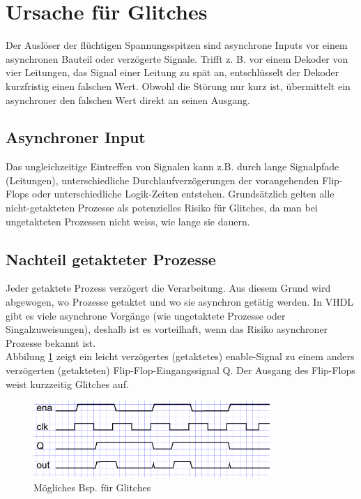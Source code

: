 \section{Ursache für Glitches}\label{sect.glitch_ursache}
Der Auslöser der flüchtigen Spannungsspitzen sind asynchrone Inputs vor einem asynchronen Bauteil oder verzögerte Signale. Trifft z. B. vor einem Dekoder von vier Leitungen, das Signal einer Leitung zu spät an, entschlüsselt der Dekoder kurzfristig einen falschen Wert. Obwohl die Störung nur kurz ist, übermittelt ein asynchroner den falschen Wert direkt an seinen Ausgang. \\

\subsection{Asynchroner Input}
Das ungleichzeitige Eintreffen von Signalen kann z.B. durch lange Signalpfade (Leitungen), unterschiedliche Durchlaufverzögerungen der vorangehenden Flip-Flops oder unterschiedliche Logik-Zeiten entstehen. Grundsätzlich gelten alle nicht-getakteten Prozesse als potenzielles Risiko für Glitches, da man bei ungetakteten Prozessen nicht weiss, wie lange sie dauern.\\

\subsection{Nachteil getakteter Prozesse}
Jeder getaktete Prozess verzögert die Verarbeitung. Aus diesem Grund wird abgewogen, wo Prozesse getaktet und wo sie asynchron getätig werden. In VHDL gibt es viele asynchrone Vorgänge (wie ungetaktete Prozesse oder Singalzuweisungen), deshalb ist es vorteilhaft, wenn das Risiko asynchroner Prozesse bekannt ist.\\


Abbilung \ref{fig.glitch.bild1} zeigt ein leicht verzögertes (getaktetes) enable-Signal zu einem anders verzögerten (getakteten) Flip-Flop-Eingangssignal Q. Der Ausgang des Flip-Flops weist kurzzeitig Glitches auf. \\
\begin{figure}[H]
	\centering
	\includegraphics[width=0.8\textwidth]{images/glitch/def_glitch_3.png}
	\caption{Mögliches Bsp. für Glitches}
	\label{fig.glitch.bild1}
\end{figure}



